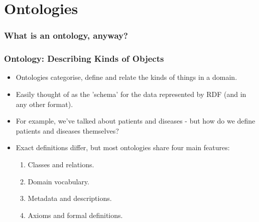 \documentclass[aspectratio=169]{beamer} %
\begin{document}
\section{Ontologies}

\begin{frame}
\frametitle{What is an ontology, anyway?}


\end{frame}

\begin{frame}
\frametitle{Ontology: Describing Kinds of Objects} \begin{itemize}
  \item Ontologies categorise, define and relate the kinds of things in a domain.
  \item Easily thought of as the 'schema' for the data represented by RDF (and
  in any other format).
  \item For example, we've talked about patients and diseases - but how do we define patients and diseases themselves?
  \item Exact definitions differ, but most ontologies share four main features:
  \begin{enumerate}
    \item Classes and relations.
    \item Domain vocabulary.
    \item Metadata and descriptions.
    \item Axioms and formal definitions.
  \end{enumerate}
\end{itemize}
\end{frame}
\end{document}
